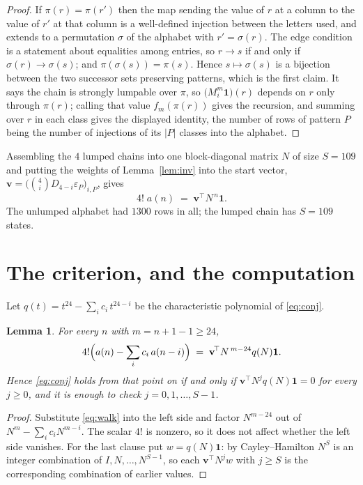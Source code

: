 \documentclass[11pt,a4paper]{article}
\theoremstyle{plain}
\newtheorem{lemma}[theorem]{Lemma}
\theoremstyle{definition}
\begin{document}
\begin{proof}
If $\pi(r)=\pi(r')$ then the map sending the value of $r$ at a column to the value of $r'$
at that column is a well-defined injection between the letters used, and extends to a
permutation $\sigma$ of the alphabet with $r'=\sigma(r)$. The edge condition is a statement
about equalities among entries, so $r\to s$ if and only if $\sigma(r)\to\sigma(s)$; and
$\pi(\sigma(s))=\pi(s)$. Hence $s\mapsto\sigma(s)$ is a bijection between the two successor
sets preserving patterns, which is the first claim. It says the chain is strongly lumpable
over $\pi$, so $\bigl(M_i^{m}\mathbf{1}\bigr)(r)$ depends on $r$ only through $\pi(r)$;
calling that value $f_m(\pi(r))$ gives the recursion, and summing over $r$ in each class
gives the displayed identity, the number of rows of pattern $P$ being the number of
injections of its $|P|$ classes into the alphabet.
\end{proof}

Assembling the $4$ lumped chains into one block-diagonal matrix $N$ of size $S=109$ and
putting the weights of Lemma~\ref{lem:inv} into the start vector,
$\mathbf{v}=\bigl(\binom{4}{i}D_{4-i}\varepsilon_P\bigr)_{i,P}$, gives
\begin{equation}\label{eq:walk}
4!\;a(n)\;=\;\mathbf{v}^{\!\top}N^{\,n}\mathbf{1} .
\end{equation}
The unlumped alphabet had $1300$ rows in all; the lumped chain has $S=109$ states.

\section{The criterion, and the computation}

Let $q(t)=t^{24}-\sum_i c_i\,t^{24-i}$ be the characteristic polynomial of
\eqref{eq:conj}.

\begin{lemma}\label{lem:crit}
For every $n$ with $m=n+1-1\ge24$,
\[
4!\Bigl(a(n)-\sum_i c_i\,a(n-i)\Bigr)\;=\;\mathbf{v}^{\!\top}N^{\,m-24}q(N)\mathbf{1} .
\]
Hence \eqref{eq:conj} holds from that point on if and only if
$\mathbf{v}^{\!\top}N^{j}q(N)\mathbf{1}=0$ for every $j\ge0$, and it is enough to check
$j=0,1,\dots,S-1$.
\end{lemma}

\begin{proof}
Substitute \eqref{eq:walk} into the left side and factor $N^{m-24}$ out of
$N^{m}-\sum_i c_iN^{m-i}$. The scalar $4!$ is nonzero, so it does not affect whether
the left side vanishes. For the last clause put $w=q(N)\mathbf{1}$: by Cayley--Hamilton
$N^{S}$ is an integer combination of $I,N,\dots,N^{S-1}$, so each
$\mathbf{v}^{\!\top}N^{j}w$ with $j\ge S$ is the corresponding combination of earlier
values.
\end{proof}
\end{document}
